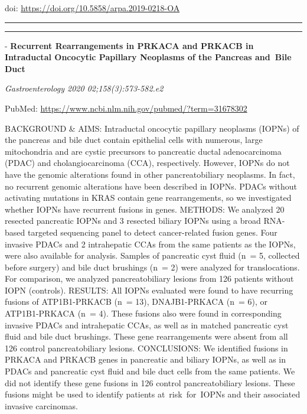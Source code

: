\documentclass[
]{article}
\begin{document}
doi: \url{https://doi.org/10.5858/arpa.2019-0218-OA}

\begin{center}\rule{0.5\linewidth}{0.5pt}\end{center}

\begin{center}\rule{0.5\linewidth}{0.5pt}\end{center}

- \textbf{Recurrent Rearrangements in PRKACA and PRKACB in Intraductal
Oncocytic Papillary Neoplasms of the Pancreas and~Bile Duct}

\emph{Gastroenterology 2020 02;158(3):573-582.e2}

PubMed: \url{https://www.ncbi.nlm.nih.gov/pubmed/?term=31678302}

BACKGROUND \& AIMS: Intraductal oncocytic papillary neoplasms (IOPNs) of
the pancreas and bile duct contain epithelial cells with numerous, large
mitochondria and are cystic precursors to pancreatic ductal
adenocarcinoma (PDAC) and cholangiocarcinoma (CCA), respectively.
However, IOPNs do not have the genomic alterations found in other
pancreatobiliary neoplasms. In fact, no recurrent genomic alterations
have been described in IOPNs. PDACs without activating mutations in KRAS
contain gene rearrangements, so we investigated whether IOPNs have
recurrent fusions in genes. METHODS: We analyzed 20 resected pancreatic
IOPNs and 3 resected biliary IOPNs using a broad RNA-based targeted
sequencing panel to detect cancer-related fusion genes. Four invasive
PDACs and 2 intrahepatic CCAs from the same patients as the IOPNs, were
also available for analysis. Samples of pancreatic cyst fluid (n~= 5,
collected before surgery) and bile duct brushings (n~= 2) were analyzed
for translocations. For comparison, we analyzed pancreatobiliary lesions
from 126 patients without IOPN (controls). RESULTS: All IOPNs evaluated
were found to have recurring fusions of ATP1B1-PRKACB (n~= 13),
DNAJB1-PRKACA (n~= 6), or ATP1B1-PRKACA (n~= 4). These fusions also were
found in corresponding invasive PDACs and intrahepatic CCAs, as well as
in matched pancreatic cyst fluid and bile duct brushings. These gene
rearrangements were absent from all 126 control pancreatobiliary
lesions. CONCLUSIONS: We identified fusions in PRKACA and PRKACB genes
in pancreatic and biliary IOPNs, as well as in PDACs and pancreatic cyst
fluid and bile duct cells from the same patients. We did not identify
these gene fusions in 126 control pancreatobiliary lesions. These
fusions might be used to identify patients at~risk~for~IOPNs and their
associated invasive carcinomas.
\end{document}

